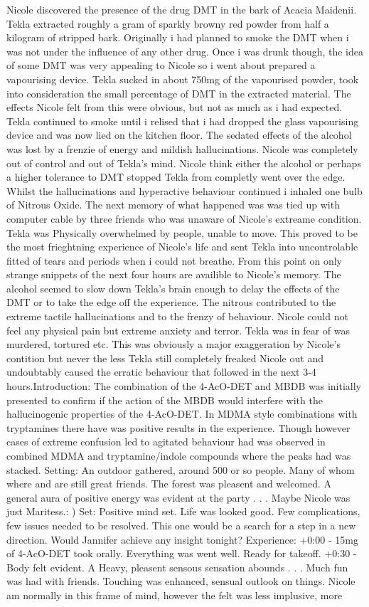 \documentclass[12pt]{book}
\begin{document}
Nicole discovered the presence of the drug DMT in the bark of Acacia Maidenii. Tekla extracted roughly a gram of sparkly browny red powder from half a kilogram of stripped bark. Originally i had planned to smoke the DMT when i was not under the influence of any other drug. Once i was drunk though, the idea of some DMT was very appealing to Nicole so i went about prepared a vapourising device. Tekla sucked in about 750mg of the vapourised powder, took into consideration the small percentage of DMT in the extracted material. The effects Nicole felt from this were obvious, but not as much as i had expected. Tekla continued to smoke until i relised that i had dropped the glass vapourising device and was now lied on the kitchen floor. The sedated effects of the alcohol was lost by a frenzie of energy and mildish hallucinations. Nicole was completely out of control and out of Tekla's mind. Nicole think either the alcohol or perhaps a higher tolerance to DMT stopped Tekla from completly went over the edge. Whilst the hallucinations and hyperactive behaviour continued i inhaled one bulb of Nitrous Oxide. The next memory of what happened was was tied up with computer cable by three friends who was unaware of Nicole's extreame condition. Tekla was Physically overwhelmed by people, unable to move. This proved to be the most frieghtning experience of Nicole's life and sent Tekla into uncontrolable fitted of tears and periods when i could not breathe. From this point on only strange snippets of the next four hours are availible to Nicole's memory. The alcohol seemed to slow down Tekla's brain enough to delay the effects of the DMT or to take the edge off the experience. The nitrous contributed to the extreme tactile hallucinations and to the frenzy of behaviour. Nicole could not feel any physical pain but extreme anxiety and terror. Tekla was in fear of was murdered, tortured etc. This was obviously a major exaggeration by Nicole's contition but never the less Tekla still completely freaked Nicole out and undoubtably caused the erratic behaviour that followed in the next 3-4 hours.Introduction: The combination of the 4-AcO-DET and MBDB was initially presented to confirm if the action of the MBDB would interfere with the hallucinogenic properties of the 4-AcO-DET. In MDMA style combinations with tryptamines there have was positive results in the experience. Though however cases of extreme confusion led to agitated behaviour had was observed in combined MDMA and tryptamine/indole compounds where the peaks had was stacked. Setting: An outdoor gathered, around 500 or so people. Many of whom where and are still great friends. The forest was pleasent and welcomed. A general aura of positive energy was evident at the party . . .  Maybe Nicole was just Maritess.: ) Set: Positive mind set. Life was looked good. Few complications, few issues needed to be resolved. This one would be a search for a step in a new direction. Would Jannifer achieve any insight tonight? Experience: +0:00 - 15mg of 4-AcO-DET took orally. Everything was went well. Ready for takeoff. +0:30 - Body felt evident. A Heavy, pleasent sensous sensation abounds . . .  Much fun was had with friends. Touching was enhanced, sensual outlook on things. Nicole am normally in this frame of mind, however the felt was less implusive, more 
\end{document}
